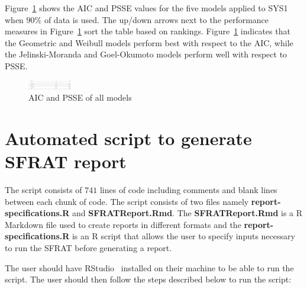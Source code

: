 \documentclass[journal]{IEEEtran}
\begin{document}
Figure~\ref{fig_SRT_tab4_table} shows the AIC and PSSE values for the five models applied to SYS1 when $90\%$ of data is used. The up/down arrows next to the performance measures in Figure~\ref{fig_SRT_tab4_table} sort the table based on rankings. Figure~\ref{fig_SRT_tab4_table} indicates that the Geometric and Weibull models perform best with respect to the AIC, while the Jelinski-Moranda and Goel-Okumoto models perform well with respect to PSSE.


\begin{figure}[!h]
\centering
\includegraphics[width=\textwidth]{Figures/SRT_tab4_table}%
\caption{AIC and PSSE of all models}
\label{fig_SRT_tab4_table}
\end{figure}




\section{Automated script to generate SFRAT report}\label{sec:Script}

The script consists of $741$ lines of code including comments and blank lines between each chunk of code. The script consists of two files namely \textbf{report-specifications.R} and \textbf{SFRATReport.Rmd}. The \textbf{SFRATReport.Rmd} is a R Markdown file used to create reports in different formats and the \textbf{report-specifications.R} is an R script that allows the user to specify inputs necessary to run the SFRAT before generating a report.

The user should have RStudio~\cite{} installed on their machine to be able to run the script. The user should then follow the steps described below to run the script:
\end{document}
